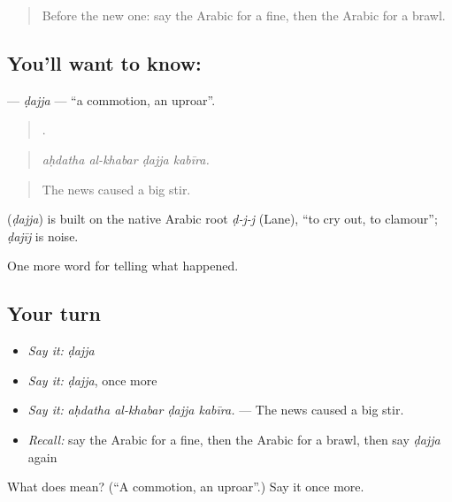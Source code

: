 \label{lesson:AR-C352-dajja}



\begin{quote}
Before the new one: say the Arabic for a fine, then the Arabic for a brawl.
\end{quote}

\subsection*{You'll want to know: }
\textbf{} — \emph{ḍajja} — \textquotedblleft{}a commotion, an uproar\textquotedblright{}.

\begin{quote}
   .
\end{quote}

\begin{quote}
\emph{aḥdatha al-khabar ḍajja kabīra.}
\end{quote}

\begin{quote}
The news caused a big stir.
\end{quote}

\begin{cousinweb}
\textbf{} (\emph{ḍajja}) is built on the native Arabic root \emph{ḍ-j-j} (Lane), \textquotedblleft{}to cry out, to clamour\textquotedblright{}; \emph{ḍajīj} is noise.
\end{cousinweb}

\begin{grammarlens}[title={What you've built}]
One more word for telling what happened.
\end{grammarlens}

\subsection*{Your turn}
\begin{itemize}
\raggedright
  \item \emph{Say it:} \emph{ḍajja}
  \item \emph{Say it:} \emph{ḍajja}, once more
  \item \emph{Say it:} \emph{aḥdatha al-khabar ḍajja kabīra.} — The news caused a big stir.
  \item \emph{Recall:} say the Arabic for a fine, then the Arabic for a brawl, then say \emph{ḍajja} again
\end{itemize}

\begin{tcolorbox}[breakable,colback=teal!4,colframe=teal!35!black,title={Before you move on}]
What does  mean? (\textquotedblleft{}A commotion, an uproar\textquotedblright{}.) Say it once more.
\end{tcolorbox}
